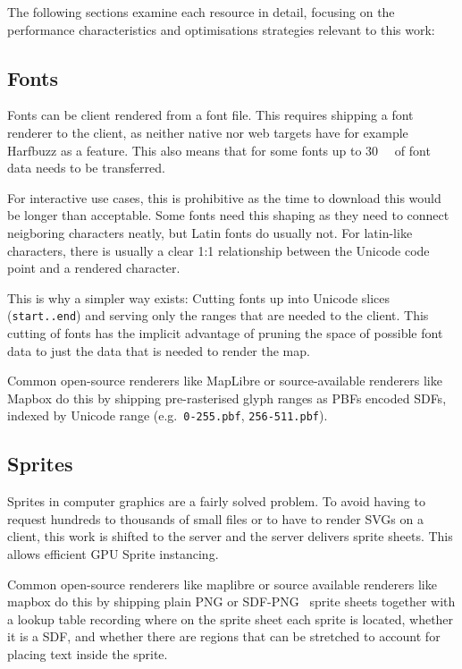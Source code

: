 The following sections examine each resource in detail, focusing on the performance characteristics and optimisations strategies relevant to this work:

\subsection{Fonts}

Fonts can be client rendered from a font file.
This requires shipping a font renderer to the client, as neither native nor web targets have for example Harfbuzz as a feature.
This also means that for some fonts up to \qty{30}{\mega\byte} of font data needs to be transferred.

For interactive use cases, this is prohibitive as the time to download this would be longer than acceptable.
Some fonts need this shaping as they need to connect neigboring characters neatly, but Latin fonts do usually not.
For latin-like characters, there is usually a clear 1:1 relationship between the Unicode code point and a rendered character.

This is why a simpler way exists:
Cutting fonts up into Unicode slices (\texttt{start..end}) and serving only the ranges that are needed to the client.
This cutting of fonts has the implicit advantage of pruning the space of possible font data to just the data that is needed to render the map.

Common open-source renderers like MapLibre or source-available renderers like Mapbox do this by shipping pre-rasterised glyph ranges as \acp{PBF} encoded \acp{SDF}, indexed by Unicode range (e.g.\ \texttt{0-255.pbf}, \texttt{256-511.pbf}).

\subsection{Sprites}

Sprites in computer graphics are a fairly solved problem.
To avoid having to request hundreds to thousands of small files or to have to render SVGs on a client, this work is shifted to the server and the server delivers sprite sheets.
This allows efficient GPU Sprite instancing.

Common open-source renderers like maplibre or source available renderers like mapbox do this by shipping plain PNG or \acs{SDF}-PNG~\cite{greenImprovedAlphatestedMagnification2007} sprite sheets together with a lookup table recording where on the sprite sheet each sprite is located, whether it is a \ac{SDF}, and whether there are regions that can be stretched to account for placing text inside the sprite.

